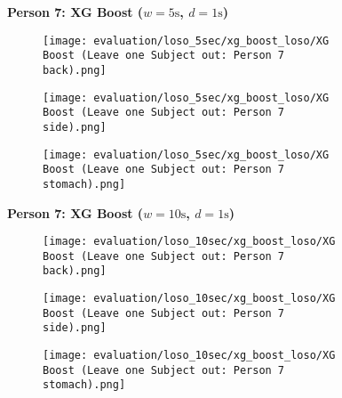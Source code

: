 \begin{figure}
    \textbf{Person 7: XG Boost ($w=5\si{\s}$, $d=1\si{\s}$)}
      \centering
      \begin{subfigure}{1\textwidth}
          \texttt{[image: evaluation/loso\_5sec/xg\_boost\_loso/XG Boost (Leave one Subject out: Person 7 back).png]}
        \end{subfigure}
        \begin{subfigure}{1\textwidth}
          \texttt{[image: evaluation/loso\_5sec/xg\_boost\_loso/XG Boost (Leave one Subject out: Person 7 side).png]}
        \end{subfigure}
        \begin{subfigure}{1\textwidth}
          \texttt{[image: evaluation/loso\_5sec/xg\_boost\_loso/XG Boost (Leave one Subject out: Person 7 stomach).png]}
      \end{subfigure}
        \textbf{Person 7: XG Boost ($w=10\si{\s}$, $d=1\si{\s}$)}
      \centering
      \begin{subfigure}{1\textwidth}
          \texttt{[image: evaluation/loso\_10sec/xg\_boost\_loso/XG Boost (Leave one Subject out: Person 7 back).png]}
        \end{subfigure}
        \begin{subfigure}{1\textwidth}
          \texttt{[image: evaluation/loso\_10sec/xg\_boost\_loso/XG Boost (Leave one Subject out: Person 7 side).png]}
        \end{subfigure}
        \begin{subfigure}{1\textwidth}
          \texttt{[image: evaluation/loso\_10sec/xg\_boost\_loso/XG Boost (Leave one Subject out: Person 7 stomach).png]}
      \end{subfigure}
  
      \label{evaluation:xgboost_loso:person6}
\end{figure}


